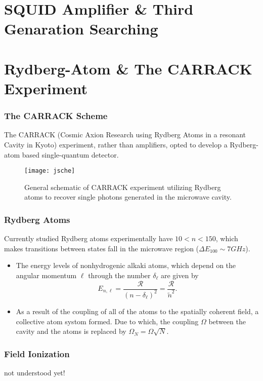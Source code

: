 \documentclass{beamer}
\begin{document}
\section{SQUID Amplifier \& Third Genaration Searching}

\section{Rydberg-Atom \& The CARRACK Experiment}
\begin{frame}
  \frametitle{The CARRACK Scheme}
The CARRACK (Cosmic Axion Research using Rydberg Atoms in a resonant Cavity in
Kyoto) experiment, rather than amplifiers, opted to develop a Rydberg-atom
based single-quantum detector.
  \begin{figure}
    \centering
    \texttt{[image: jsche]}
    \caption{General schematic of CARRACK experiment utilizing Rydberg atoms
      to recover single photons generated in the microwave cavity.}
  \end{figure}
\end{frame}
\begin{frame}
  \frametitle{Rydberg Atoms}
  Currently studied Rydberg atoms experimentally have $10<n<150$, which makes
transitions between states fall in the microwave region ($\Delta E_{100} \sim 7GHz$).
  \begin{itemize}
  \item The energy levels of nonhydrogenic alkaki atoms, which depend on the angular momentum $\ell$
    through the number $\delta_{\ell}$ are given
    by $$E_{n,\ell}=\frac{\mathcal{R}}{(n-\delta_{\ell})^2}=\frac{\mathcal{R}}{\tilde{n}^2}.$$
  \item As a result of the coupling of all of the atoms to the spatially
    coherent field, a collective atom systom formed. Due to
    which, the coupling $\Omega$ between the cavity and the atoms is replaced
    by $\Omega_N=\Omega \sqrt{N}$.
  \end{itemize}
\end{frame}
\begin{frame}
  \frametitle{Field Ionization}
not understood yet!  
\end{frame}
\end{document}
